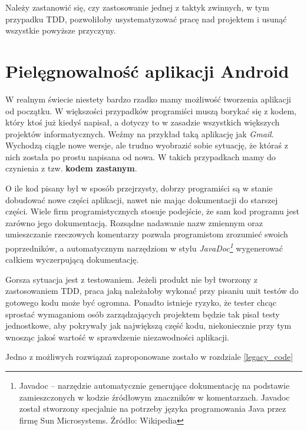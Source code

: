 Należy zastanowić się, czy zastosowanie jednej z taktyk zwinnych, w tym przypadku TDD, pozwoliłoby usystematyzować pracę nad projektem i usunąć wszystkie powyższe przyczyny.

\section{Pielęgnowalność aplikacji Android}
\label{pielegnowalnosc_aplikacji}
W realnym świecie niestety bardzo rzadko mamy możliwość tworzenia aplikacji od początku. W większości przypadków programiści muszą borykać się z kodem, który ktoś już kiedyś napisał, a dotyczy to w zasadzie wszystkich większych projektów informatycznych. Weźmy na przykład taką aplikację jak \textit{Gmail}. Wychodzą ciągle nowe wersje, ale trudno wyobrazić sobie sytuację, że któraś z nich została po prostu napisana od nowa. W takich przypadkach mamy do czynienia z tzw. \textbf{kodem zastanym}.

O ile kod pisany był w sposób przejrzysty, dobrzy programiści są w stanie dobudować nowe części aplikacji, nawet nie mając dokumentacji do starszej części. Wiele firm programistycznych stosuje podejście, że sam kod programu jest zarówno jego dokumentacją. Rozsądne nadawanie nazw zmiennym oraz umieszczanie rzeczowych komentarzy pozwala programistom zrozumieć swoich poprzedników, a automatycznym narzędziom w stylu \textit{JavaDoc\footnote{Javadoc – narzędzie automatycznie generujące dokumentację na podstawie zamieszczonych w kodzie źródłowym znaczników w komentarzach. Javadoc został stworzony specjalnie na potrzeby języka programowania Java przez firmę Sun Microsystems. Źródło: Wikipedia}} wygenerować całkiem wyczerpującą dokumentację.

Gorsza sytuacja jest z testowaniem. Jeżeli produkt nie był tworzony z zastosowaniem TDD, praca jaką należałoby wykonać przy pisaniu unit testów do gotowego kodu może być ogromna. Ponadto istnieje ryzyko, że tester chcąc sprostać wymaganiom osób zarządzających projektem będzie tak pisał testy jednostkowe, aby pokrywały jak największą część kodu, niekoniecznie przy tym wnosząc jakoś wartość w sprawdzenie niezawodności aplikacji.

Jedno z możliwych rozwiązań zaproponowane zostało w rozdziale \ref{legacy_code}